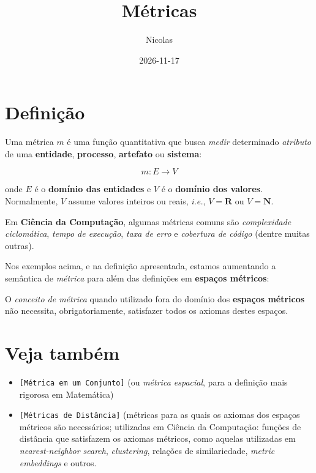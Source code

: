 \documentclass[11pt,a4paper]{scrartcl}
\author{Nicolas}
\date{2026-11-17}
\title{Métricas}
\begin{document}
\maketitle
\tableofcontents

\section{Definição}
\label{sec:orgeed2053}
Uma métrica \(m\) é uma função quantitativa que busca \emph{medir} determinado \emph{atributo} de uma \textbf{entidade}, \textbf{processo}, \textbf{artefato} ou \textbf{sistema}:

$$
m : E \to V
$$

onde \(E\) é o \textbf{domínio das entidades} e \(V\) é o \textbf{domínio dos valores}. Normalmente, \(V\) assume valores inteiros ou reais, \emph{i.e.}, \(V = \mathbf{R}\) ou \(V = \mathbf{N}\).

\begin{exemplo}
Em \textbf{Ciência da Computação}, algumas métricas comuns são \emph{complexidade ciclomática}, \emph{tempo de execução}, \emph{taxa de erro} e \emph{cobertura de código} (dentre muitas outras).
\label{métricas--exemplos-em-computer-science}
\end{exemplo}

Nos exemplos acima, e na definição apresentada, estamos aumentando a semântica de \emph{métrica} para além das definições em \textbf{espaços métricos}:

\begin{teorema}[title={Observação}]
O \emph{conceito de métrica} quando utilizado fora do domínio dos \textbf{espaços métricos} não necessita, obrigatoriamente, satisfazer todos os axiomas destes espaços.
\end{teorema}
\section{Veja também}
\label{sec:org8e99c4d}
\begin{itemize}
\item \texttt{[Métrica em um Conjunto]} (ou \emph{métrica espacial}, para a definição mais rigorosa em Matemática)
\item \texttt{[Métricas de Distância]}  (métricas para as quais os axiomas dos espaços métricos são necessários; utilizadas em Ciência da Computação: funções de distância que satisfazem os axiomas métricos, como aquelas utilizadas em \emph{nearest-neighbor search}, \emph{clustering}, relações de similariedade, \emph{metric embeddings} e outros.
\end{itemize}
\end{document}
